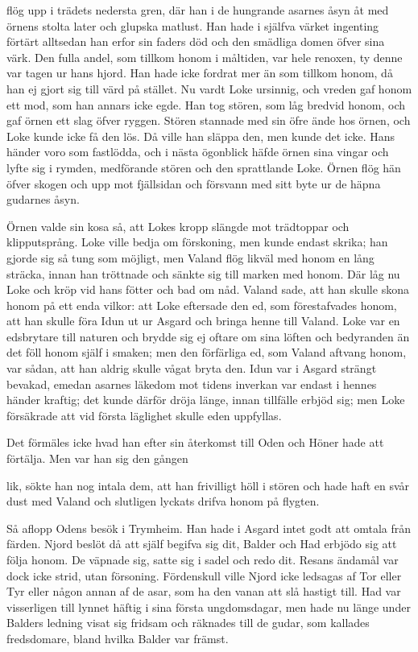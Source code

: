 flög upp i trädets nedersta gren, där han i de hungrande asarnes åsyn åt
med örnens stolta later och glupska matlust. Han hade i själfva värket
ingenting förtärt alltsedan han erfor sin faders död och den smädliga
domen öfver sina värk. Den fulla andel, som tillkom honom i måltiden,
var hele renoxen, ty denne var tagen ur hans hjord. Han hade icke
fordrat mer än som tillkom honom, då han ej gjort sig till värd på
stället. Nu vardt Loke ursinnig, och vreden gaf honom ett mod, som han
annars icke egde. Han tog stören, som låg bredvid honom, och gaf örnen
ett slag öfver ryggen. Stören stannade med sin öfre ände hos örnen, och
Loke kunde icke få den lös. Då ville han släppa den, men kunde det icke.
Hans händer voro som fastlödda, och i nästa ögonblick häfde örnen sina
vingar och lyfte sig i rymden, medförande stören och den sprattlande
Loke. Örnen flög hän öfver skogen och upp mot fjällsidan och försvann
med sitt byte ur de häpna gudarnes åsyn.

Örnen valde sin kosa så, att Lokes kropp slängde mot trädtoppar och
klipputsprång. Loke ville bedja om förskoning, men kunde endast skrika;
han gjorde sig så tung som möjligt, men Valand flög likväl med honom en
lång sträcka, innan han tröttnade och sänkte sig till marken med honom.
Där låg nu Loke och kröp vid hans fötter och bad om nåd. Valand sade,
att han skulle skona honom på ett enda vilkor: att Loke eftersade den
ed, som förestafvades honom, att han skulle föra Idun ut ur Asgard och
bringa henne till Valand. Loke var en edsbrytare till naturen och brydde
sig ej oftare om sina löften och bedyranden än det föll honom själf i
smaken; men den förfärliga ed, som Valand aftvang honom, var sådan, att
han aldrig skulle vågat bryta den. Idun var i Asgard strängt bevakad,
emedan asarnes läkedom mot tidens inverkan var endast i hennes händer
kraftig; det kunde därför dröja länge, innan tillfälle erbjöd sig; men
Loke försäkrade att vid första läglighet skulle eden uppfyllas.

Det förmäles icke hvad han efter sin återkomst till Oden och Höner hade
att förtälja. Men var han sig den gången

lik, sökte han nog intala dem, att han frivilligt höll i stören och hade
haft en svår dust med Valand och slutligen lyckats drifva honom på
flygten.

Så aflopp Odens besök i Trymheim. Han hade i Asgard intet godt att
omtala från färden. Njord beslöt då att själf begifva sig dit, Balder
och Had erbjödo sig att följa honom. De väpnade sig, satte sig i sadel
och redo dit. Resans ändamål var dock icke strid, utan försoning.
Fördenskull ville Njord icke ledsagas af Tor eller Tyr eller någon annan
af de asar, som ha den vanan att slå hastigt till. Had var visserligen
till lynnet häftig i sina första ungdomsdagar, men hade nu länge under
Balders ledning visat sig fridsam och räknades till de gudar, som
kallades fredsdomare, bland hvilka Balder var främst.

